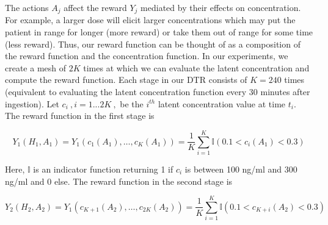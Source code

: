 The actions $A_j$ affect the reward $Y_j$ mediated by their effects on concentration.  For example, a larger dose will elicit larger concentrations which may put the patient in range for longer (more reward) or take them out of range for some time (less reward).  Thus, our reward function can be thought of as a composition of the reward function and the concentration function.  In our experiments, we create a mesh of $2K$ times at which we can evaluate the latent concentration and compute the reward function.  Each stage in our DTR consists of $K=240$ times (equivalent to evaluating the latent concentration function every 30 minutes after ingestion).  Let $ c_i \>,  i=1...2K \>, $ be the $ i^{th}$ latent concentration value at time $ t_i $.  The reward function in the first stage is

\begin{equation}
Y_1(H_1, A_1) = Y_1(c_1(A_1), \dots, c_K(A_1)) = \dfrac{1}{K}\sum_{i=1}^K \mathbb{I}(0.1 < c_i(A_1) < 0.3)
\end{equation}

\noindent Here, $ \mathbb{I} $ is an indicator function returning 1 if $c_i$ is between 100 ng/ml and 300 ng/ml and 0 else.
%
\noindent The reward function in the second stage is

\begin{equation}
Y_2(H_2, A_2) = Y_1(c_{K+1}(A_2), \dots, c_{2K}(A_2)) = \dfrac{1}{K}\sum_{i=1}^K \mathbb{I}(0.1 < c_{K+i}(A_2) < 0.3)
\end{equation}

